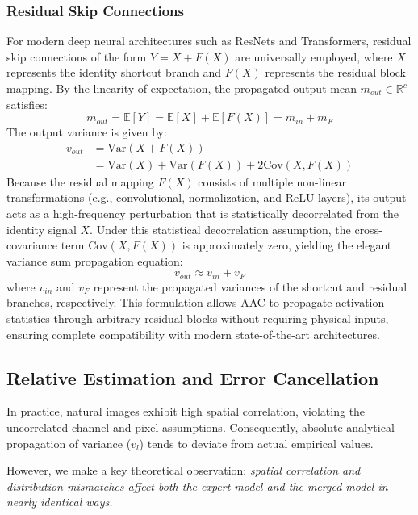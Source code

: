 \documentclass{article}
\theoremstyle{plain}
\theoremstyle{definition}
\theoremstyle{remark}
\begin{document}
\subsubsection{Residual Skip Connections}
For modern deep neural architectures such as ResNets and Transformers, residual skip connections of the form $Y = X + F(X)$ are universally employed, where $X$ represents the identity shortcut branch and $F(X)$ represents the residual block mapping. By the linearity of expectation, the propagated output mean $m_{out} \in \mathbb{R}^c$ satisfies:
\begin{equation}
    m_{out} = \mathbb{E}[Y] = \mathbb{E}[X] + \mathbb{E}[F(X)] = m_{in} + m_{F}
\end{equation}
The output variance is given by:
\begin{align}
    v_{out} &= \text{Var}(X + F(X)) \nonumber \\
    &= \text{Var}(X) + \text{Var}(F(X)) + 2\text{Cov}(X, F(X))
\end{align}
Because the residual mapping $F(X)$ consists of multiple non-linear transformations (e.g., convolutional, normalization, and ReLU layers), its output acts as a high-frequency perturbation that is statistically decorrelated from the identity signal $X$. Under this statistical decorrelation assumption, the cross-covariance term $\text{Cov}(X, F(X))$ is approximately zero, yielding the elegant variance sum propagation equation:
\begin{equation}
    v_{out} \approx v_{in} + v_{F}
\end{equation}
where $v_{in}$ and $v_{F}$ represent the propagated variances of the shortcut and residual branches, respectively. This formulation allows AAC to propagate activation statistics through arbitrary residual blocks without requiring physical inputs, ensuring complete compatibility with modern state-of-the-art architectures.

\subsection{Relative Estimation and Error Cancellation}
In practice, natural images exhibit high spatial correlation, violating the uncorrelated channel and pixel assumptions. Consequently, absolute analytical propagation of variance ($v_l$) tends to deviate from actual empirical values.

However, we make a key theoretical observation: \textit{spatial correlation and distribution mismatches affect both the expert model and the merged model in nearly identical ways.}
\end{document}

